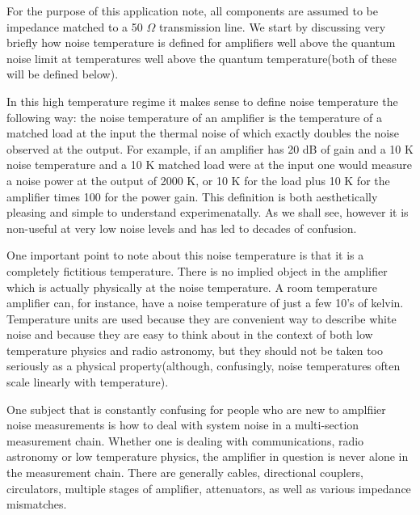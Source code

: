 \documentclass[11pt]{article}
\begin{document}
    		For the purpose of this application note, all components are assumed to be impedance matched to a 50 $\Omega$ transmission line.  We start by discussing very briefly how noise temperature is defined for amplifiers well above the quantum noise limit at temperatures well above the quantum temperature(both of these will be defined below).  





    	In this high temperature regime it makes sense to define noise temperature the following way:  the noise temperature of an amplifier is the temperature of a matched load at the input the thermal noise of which exactly doubles the noise observed at the output.  For example, if an amplifier has 20 dB of gain and a 10 K noise temperature and a 10 K matched load were at the input one would measure a noise power at the output of 2000 K, or 10 K for the load plus 10 K for the amplifier times 100 for the power gain.  This definition is both aesthetically pleasing and simple to understand experimenatally.  As we shall see, however it is non-useful at very low noise levels and has led to decades of confusion.  





	One important point to note about this noise temperature is that it is a completely fictitious temperature.  There is no implied object in the amplifier which is actually physically at the noise temperature.  A room temperature amplifier can, for instance, have a noise temperature of just a few 10's of kelvin.  Temperature units are used because they are convenient way to describe white noise and because they are easy to think about in the context of both low temperature physics and radio astronomy, but they should not be taken too seriously as a physical property(although, confusingly, noise temperatures often scale linearly with temperature).  




    	One subject that is constantly confusing for people who are new to amplfiier noise measurements is how to deal with system noise in a multi-section measurement chain.  Whether one is dealing with communications, radio astronomy or low temperature physics, the amplifier in question is never alone in the measurement chain.  There are generally cables, directional couplers, circulators, multiple stages of amplifier, attenuators, as well as various impedance mismatches.  
\end{document}

